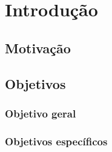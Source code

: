 \chapter{Introdução}

\section{Motivação} %


\section{Objetivos}




\subsection{Objetivo geral} 




\subsection{Objetivos específicos} 
\label{sec:objespecif}

